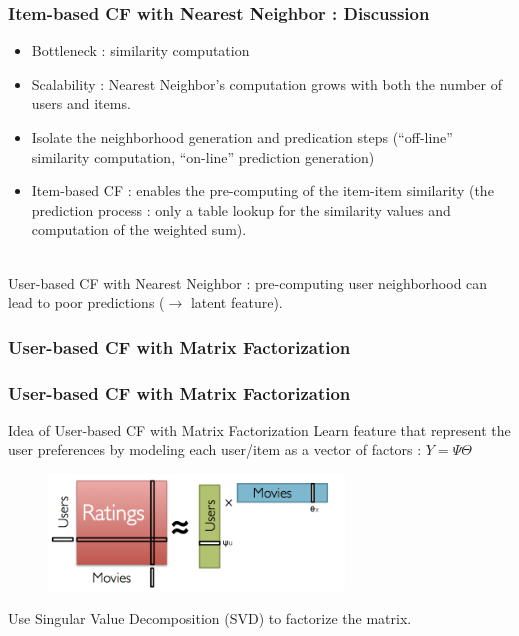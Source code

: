 \documentclass[10pt,handout,english]{beamer}
\begin{document}
			\begin{frame}
			\frametitle{Item-based CF with Nearest Neighbor : Discussion}
				\begin{itemize}
					\item Bottleneck : similarity computation
					\item Scalability : Nearest Neighbor's computation grows with both the number of users and items.
					\item Isolate the neighborhood generation and predication steps (``off-line'' similarity computation, ``on-line'' prediction generation)
					\item Item-based CF : enables the pre-computing of the item-item similarity (the prediction process : only a table lookup for the similarity values and computation of the weighted sum).\\~\\
				\end{itemize}
				User-based CF with Nearest Neighbor : pre-computing user neighborhood can lead to poor predictions ($\rightarrow$ latent feature).

			\end{frame}

			\subsubsection{User-based CF with Matrix Factorization}
			\begin{frame}
			\frametitle{User-based CF with Matrix Factorization}
				\begin{block}{Idea of User-based CF with Matrix Factorization}
					Learn feature that represent the user preferences by modeling each user/item as a vector of factors :
						$Y = \Psi \Theta$
				\end{block}
				\begin{figure}[h!]
	            	\centering
	                \includegraphics[width=0.7\textwidth]{matrix_factorization.png}
		        \end{figure}
		        Use Singular Value Decomposition (SVD) to factorize the matrix.

			\end{frame}
\end{document}
